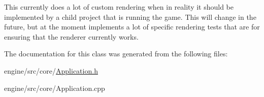 This currently does a lot of custom rendering when in reality it should be implemented by a child project that is running the game. This will change in the future, but at the moment implements a lot of specific rendering tests that are for ensuring that the renderer currently works. 

The documentation for this class was generated from the following files\+:\begin{DoxyCompactItemize}
\item 
engine/src/core/\hyperlink{Application_8h}{Application.\+h}\item 
engine/src/core/Application.\+cpp\end{DoxyCompactItemize}

